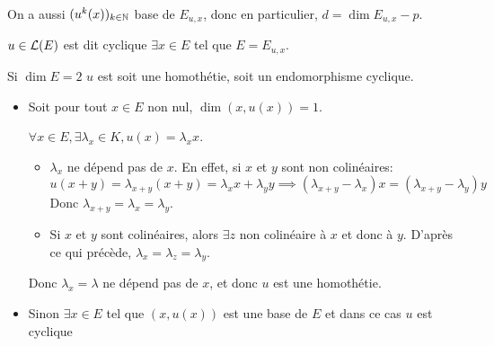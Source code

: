 On a aussi $(u^k(x))_{k \in \mathbb{N}}$ base de $E_{u,x}$, donc en particulier, $ d = \dim E_{u,x} - p $.

\begin{definition}
	$u \in \mathcal{L}(E)$ est dit cyclique \ssi $\exists x \in E$ tel que $E = E_{u,x}$.
\end{definition}

\begin{example}
	Si $\dim E = 2$ $u$ est soit une homothétie, soit un endomorphisme cyclique.

	\begin{itemize}
		\item Soit pour tout $x \in E$ non nul, $\dim (x, u(x)) = 1$.

		      $\forall x \in E, \exists \lambda_x \in K, u(x) = \lambda_x x$.

		      \begin{itemize}
			      \item $\lambda_x$ ne dépend pas de $x$. En effet, si $x$ et $y$ sont non colinéaires:
			            $$ u (x+y) = \lambda_{x+y} (x+y) = \lambda_x x + \lambda_y y \implies (\lambda_{x+y} - \lambda_x) x = (\lambda_{x+y} - \lambda_y) y$$
			            Donc $\lambda_{x+y} = \lambda_x = \lambda_y$.

			      \item Si $x$ et $y$ sont colinéaires, alors $\exists z$ non colinéaire à $x$ et donc à $y$. D'après ce qui précède, $\lambda_x = \lambda_z = \lambda_y$.
		      \end{itemize}

		      Donc $\lambda_x = \lambda$ ne dépend pas de $x$, et donc $u$ est une homothétie.

		\item Sinon $\exists x \in E$ tel que $(x, u(x))$ est une base de $E$ et dans ce cas $u$ est cyclique
	\end{itemize}
\end{example}

